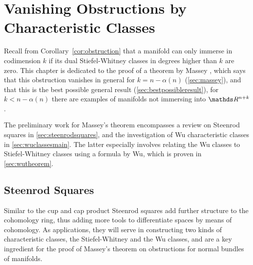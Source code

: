 % 

\chapter{Vanishing Obstructions by Characteristic Classes} %
\label{chap:massey}
Recall from Corollary~\ref{cor:obstruction} that a manifold can
only immerse in codimension $k$ if its dual Stiefel-Whitney classes in
degrees higher than $k$ are zero.
This chapter is dedicated to the proof of a theorem by Massey
\cite{massey}, which says that this obstruction vanishes in general for
$k=n-\alpha(n)$ (\autoref{sec:massey}), and that this is the best
possible general result (\autoref{sec:bestpossibleresult}), \idest for
$k<n-\alpha(n)$ there are examples of manifolds not immersing into
$\R^{n+k}$.

The preliminary work for Massey's theorem encompasses a review on
Steenrod squares in \autoref{sec:steenrodsquares}, and the
investigation of Wu characteristic classes in
\autoref{sec:wuclassesmain}.
The latter especially involves relating the Wu classes to
Stiefel-Whitney classes using a formula by Wu, which is proven in
\autoref{sec:wutheorem}.

\section{Steenrod Squares}\label{sec:steenrodsquares}
Similar to the cup and cap product Steenrod squares add further
structure to the cohomology ring, thus adding more tools to
differentiate spaces by means of cohomology.
As applications, they will serve in constructing two kinds of
characteristic classes, the Stiefel-Whitney and the Wu classes, and
are a key ingredient for the proof of Massey's theorem on obstructions
for normal bundles of manifolds.

